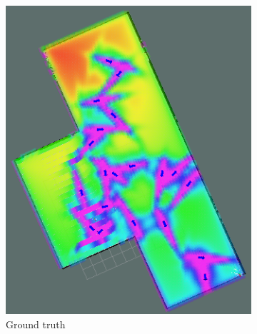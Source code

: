 \documentclass{article}  %
\begin{document}
	\begin{figure}[tbh]
	\hspace{5mm}
      \begin{subfigure}[b]{0.3\columnwidth}
    \includegraphics[width=1.\textwidth]{images/gt_ct.png}
    \caption{Ground truth}
    \label{fig:get_cf}
  \end{subfigure}
  \begin{subfigure}[b]{0.292\columnwidth}

\end{subfigure}
\end{figure}
\end{document}
